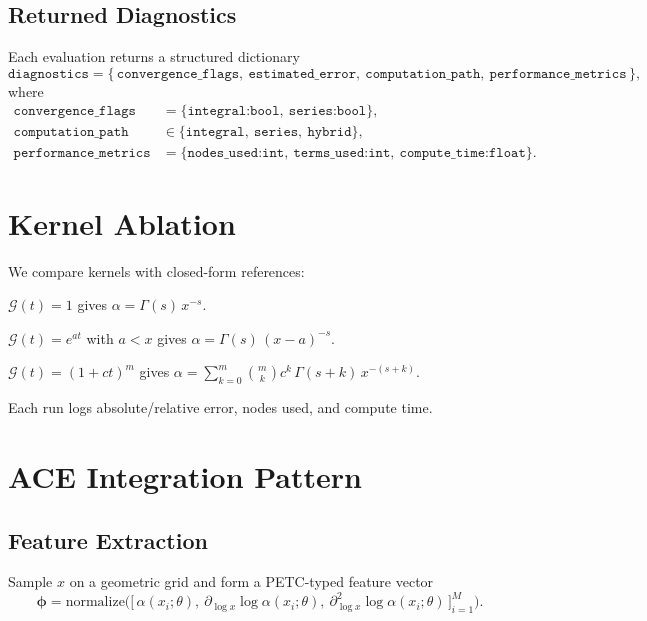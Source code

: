 \documentclass[11pt]{article}
\theoremstyle{remark}
\begin{document}
\subsection{Returned Diagnostics}
\label{sec:diagnostics}
Each evaluation returns a structured dictionary
\begin{equation*}
\texttt{diagnostics}=\{\,\texttt{convergence\_flags},\ \texttt{estimated\_error},\ \texttt{computation\_path},\ \texttt{performance\_metrics}\,\},
\end{equation*}
where
\begin{align*}
\texttt{convergence\_flags}&=\{\texttt{integral:bool},\ \texttt{series:bool}\},\\
\texttt{computation\_path}&\in\{\texttt{integral},\ \texttt{series},\ \texttt{hybrid}\},\\
\texttt{performance\_metrics}&=\{\texttt{nodes\_used:int},\ \texttt{terms\_used:int},\ \texttt{compute\_time:float}\}.
\end{align*}

\section{Kernel Ablation}
\label{sec:ablation}
We compare kernels with closed-form references:
\begin{description}[leftmargin=1.8em,labelsep=0.5em]
  \item[\(\bm{G_1}\): baseline] \(\mathcal{G}(t)=1\) gives \(\alpha=\Gamma(s)\,x^{-s}\).
  \item[\(\bm{G_2}\): exp-shift] \(\mathcal{G}(t)=e^{a t}\) with \(a<x\) gives \(\alpha=\Gamma(s)\,(x-a)^{-s}\).
  \item[\(\bm{G_3}\): polynomial] \(\mathcal{G}(t)=(1+ct)^m\) gives \(\alpha=\sum_{k=0}^m\binom{m}{k}c^k\,\Gamma(s+k)\,x^{-(s+k)}\).
\end{description}
Each run logs absolute/relative error, nodes used, and compute time.

\section{ACE Integration Pattern}
\label{sec:ace}
\subsection{Feature Extraction}
Sample \(x\) on a geometric grid and form a PETC-typed feature vector
\begin{equation}
\bm{\phi}=\mathrm{normalize}\Big( \big[\,\alpha(x_i;\theta),\ \partial_{\log x}\log\alpha(x_i;\theta),\ \partial_{\log x}^2\log\alpha(x_i;\theta)\,\big]_{i=1}^M \Big).
\end{equation}
\end{document}
